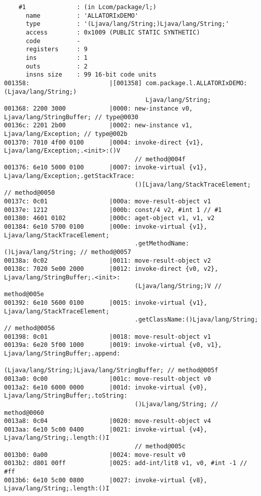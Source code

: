 \begin{lstlisting}
    #1              : (in Lcom/package/l;)
      name          : 'ALLATORIxDEMO'
      type          : '(Ljava/lang/String;)Ljava/lang/String;'
      access        : 0x1009 (PUBLIC STATIC SYNTHETIC)
      code          -
      registers     : 9
      ins           : 1
      outs          : 2
      insns size    : 99 16-bit code units
001358:                      |[001358] com.package.l.ALLATORIxDEMO:(Ljava/lang/String;)
                                       Ljava/lang/String;
001368: 2200 3000            |0000: new-instance v0, Ljava/lang/StringBuffer; // type@0030
00136c: 2201 2b00            |0002: new-instance v1, Ljava/lang/Exception; // type@002b
001370: 7010 4f00 0100       |0004: invoke-direct {v1}, Ljava/lang/Exception;.<init>:()V
                                    // method@004f
001376: 6e10 5000 0100       |0007: invoke-virtual {v1}, Ljava/lang/Exception;.getStackTrace:
                                    ()[Ljava/lang/StackTraceElement; // method@0050
00137c: 0c01                 |000a: move-result-object v1
00137e: 1212                 |000b: const/4 v2, #int 1 // #1
001380: 4601 0102            |000c: aget-object v1, v1, v2
001384: 6e10 5700 0100       |000e: invoke-virtual {v1}, Ljava/lang/StackTraceElement;
                                    .getMethodName:()Ljava/lang/String; // method@0057
00138a: 0c02                 |0011: move-result-object v2
00138c: 7020 5e00 2000       |0012: invoke-direct {v0, v2}, Ljava/lang/StringBuffer;.<init>:
                                    (Ljava/lang/String;)V // method@005e
001392: 6e10 5600 0100       |0015: invoke-virtual {v1}, Ljava/lang/StackTraceElement;
                                    .getClassName:()Ljava/lang/String; // method@0056
001398: 0c01                 |0018: move-result-object v1
00139a: 6e20 5f00 1000       |0019: invoke-virtual {v0, v1}, Ljava/lang/StringBuffer;.append:
                                    (Ljava/lang/String;)Ljava/lang/StringBuffer; // method@005f
0013a0: 0c00                 |001c: move-result-object v0
0013a2: 6e10 6000 0000       |001d: invoke-virtual {v0}, Ljava/lang/StringBuffer;.toString:
                                    ()Ljava/lang/String; // method@0060
0013a8: 0c04                 |0020: move-result-object v4
0013aa: 6e10 5c00 0400       |0021: invoke-virtual {v4}, Ljava/lang/String;.length:()I
                                    // method@005c
0013b0: 0a00                 |0024: move-result v0
0013b2: d801 00ff            |0025: add-int/lit8 v1, v0, #int -1 // #ff
0013b6: 6e10 5c00 0800       |0027: invoke-virtual {v8}, Ljava/lang/String;.length:()I

\end{lstlisting}
